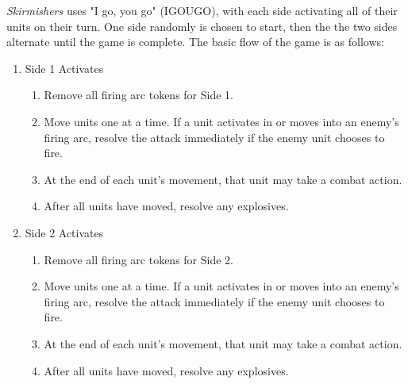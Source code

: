 \emph{Skirmishers} uses "I go, you go" (IGOUGO), with each side activating all of their units on their turn.
One side randomly is chosen to start, then the the two sides alternate until the game is complete.
The basic flow of the game is as follows:

\begin{enumerate}

  \item Side 1 Activates

  \begin{enumerate}

    \item Remove all firing arc tokens for Side 1.

    \item Move units one at a time.
       If a unit activates in or moves into an enemy's firing arc, resolve the attack immediately if the enemy unit chooses to fire.

    \item At the end of each unit's movement, that unit may take a combat action.

    \item After all units have moved, resolve any explosives.

  \end{enumerate}

  \item Side 2 Activates

  \begin{enumerate}

    \item Remove all firing arc tokens for Side 2.

    \item Move units one at a time.
       If a unit activates in or moves into an enemy's firing arc, resolve the attack immediately if the enemy unit chooses to fire.

    \item At the end of each unit's movement, that unit may take a combat action.

    \item After all units have moved, resolve any explosives.

  \end{enumerate}

\end{enumerate}
